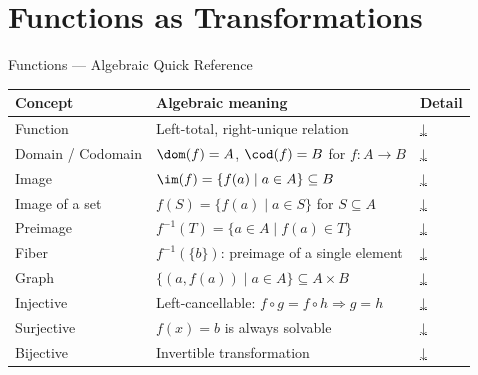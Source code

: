 
\section{Functions as Transformations}

\begin{toolkitbox}{Functions — Algebraic Quick Reference}
\small
\begin{tabular}{l l l}
\toprule
\textbf{Concept} & \textbf{Algebraic meaning} & \textbf{Detail} \\
\midrule
Function          & Left-total, right-unique relation                     & \hyperref[def:alg-function]{↓} \\
Domain / Codomain & $\dom(f) = A$,\; $\cod(f) = B$ for $f : A \to B$     & \hyperref[def:alg-function]{↓} \\
Image             & $\im(f) = \{f(a) \mid a \in A\} \subseteq B$         & \hyperref[def:alg-image]{↓} \\
Image of a set    & $f(S) = \{f(a) \mid a \in S\}$ for $S \subseteq A$   & \hyperref[def:alg-image]{↓} \\
Preimage          & $f^{-1}(T) = \{a \in A \mid f(a) \in T\}$            & \hyperref[def:alg-image]{↓} \\
Fiber             & $f^{-1}(\{b\})$: preimage of a single element         & \hyperref[def:alg-fiber]{↓} \\
Graph             & $\{(a, f(a)) \mid a \in A\} \subseteq A \times B$    & \hyperref[def:alg-graph]{↓} \\
Injective         & Left-cancellable: $f \circ g = f \circ h \Rightarrow g = h$ & \hyperref[def:alg-injective]{↓} \\
Surjective        & $f(x) = b$ is always solvable                        & \hyperref[def:alg-surjective]{↓} \\
Bijective         & Invertible transformation                             & \hyperref[def:alg-bijective]{↓} \\

\end{tabular}
\end{toolkitbox}
